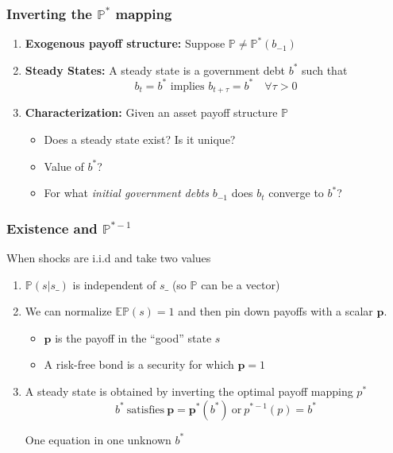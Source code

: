 \documentclass{beamer}
\begin{document}
%
\begin{frame}
	\frametitle{Inverting the $\mathbb{P}^*$ mapping}
	\begin{enumerate}
		\item  \textbf{Exogenous payoff structure:} Suppose $\mathbb{P}\neq \mathbb{P}^*(b_{-1})$
		
		\item \textbf{Steady States: } A steady state is a government debt   $b^*$ such that
		\[b_{t}=b^* \text{ implies } b_{t+\tau}=b^*\quad \forall \tau >0\]
	
			
		\item \textbf{Characterization: } Given an asset payoff structure $\mathbb{P}$
		\begin{itemize}
			\item Does a steady state exist? Is it unique?
			\item Value of $b^*$?
			\item For what   \emph{initial government debts} $b_{-1}$ does  $b_t$ converge to $b^*$?
 			\end{itemize}
	\end{enumerate}
\end{frame}



 \begin{frame}
  \frametitle{Existence and $\mathbb{P}^{* -1}$}


 When shocks are i.i.d and take two values

  \begin{enumerate}

\item $\mathbb{P}(s|s\_)$ is independent of $s\_$ (so $\mathbb{P}$ can be a vector)
\item We can normalize $\mathbb{E}\mathbb{P}(s)=1$ and  then pin down payoffs with a scalar $\bm{p}$.
\begin{itemize}
 \item $\bm{p}$ is the payoff in the ``good'' state $s$
 \item A risk-free bond is a security for which $\bm{p}=1$
\end{itemize}

\item A steady state is obtained by inverting the optimal payoff mapping $p^*$
\begin{equation*}
\label{eq-ss}
b^* \ \textrm{satisfies} \  \bm{p}=\bm{p}^*(b^*) \ \textrm{or} \ p^{* -1}(p) = b^*
\end{equation*}

One equation in one unknown $b^*$
\end{enumerate}
\end{frame}
\end{document}

